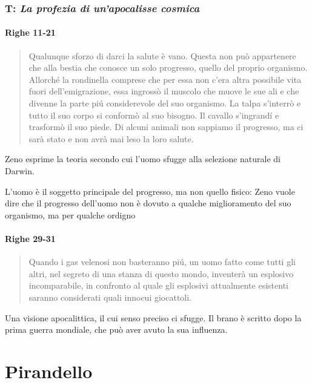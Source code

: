 \documentclass[a4paper, twoside, titlepage]{book}
\begin{document}
\section{T: \textit{La profezia di un'apocalisse cosmica}}

\subsection*{Righe 11-21}

\begin{quotation}
Qualunque sforzo di darci la salute è vano. Questa non può appartenere che alla bestia che conosce un solo progresso, quello del proprio organismo. Allorché la rondinella comprese che per essa non c’era altra possibile vita fuori dell’emigrazione, essa ingrossò il muscolo che muove le sue ali e che divenne la parte piú considerevole del suo organismo. La talpa s’interrò e tutto il suo corpo si conformò al suo bisogno. Il cavallo s’ingrandí e trasformò il suo piede. Di alcuni animali non sappiamo il progresso, ma ci sarà stato e non avrà mai leso la loro salute. 
\end{quotation}

Zeno esprime la teoria secondo cui l'uomo sfugge alla selezione naturale di Darwin.

L'uomo è il soggetto principale del progresso, ma non quello fisico: Zeno vuole dire che il progresso dell'uomo non è dovuto a qualche miglioramento del suo organismo, ma per qualche ordigno

\subsection*{Righe 29-31}

\begin{quotation}
Quando i gas velenosi non basteranno piú, un uomo fatto come tutti gli altri, nel segreto di una stanza di questo mondo, inventerà un esplosivo incomparabile, in confronto al quale gli esplosivi attualmente esistenti saranno considerati quali innocui giocattoli.
\end{quotation}

Una visione apocalittica, il cui senso preciso ci sfugge. Il brano è scritto dopo la prima guerra mondiale, che può aver avuto la sua influenza.

\part{Pirandello}
\end{document}
